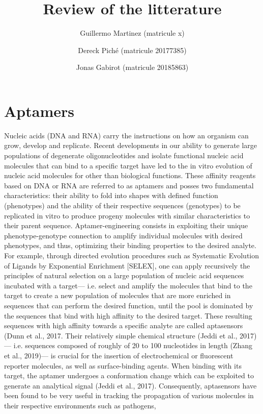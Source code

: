 \documentclass{article}
\title{Review of the litterature}
\author
{
    Guillermo Martinez (matricule x)
    \and
    Dereck Piché (matricule 20177385)
    \and
    Jonas Gabirot (matricule 20185863)
}
\begin{document}
\maketitle

\section*{Aptamers}
Nucleic acids (DNA and RNA) carry the instructions on 
how an organism can grow, develop and replicate. Recent
 developments in our ability to generate large populations of 
 degenerate oligonucleotides and isolate functional nucleic acid 
 molecules that can bind to a specific target have led to the in 
 vitro evolution of nucleic acid molecules for other than biological functions. 
 These affinity reagents based on DNA or RNA are referred to as aptamers 
 and posses two fundamental characteristics: their ability to fold 
 into shapes with defined function (phenotypes) and the ability of 
 their respective sequences (genotypes) to be replicated in vitro to 
 produce progeny molecules with similar characteristics to their 
 parent sequence. Aptamer-engineering consists in exploiting their 
 unique phenotype-genotype connection to amplify individual molecules 
 with desired phenotypes, and thus, optimizing their binding properties 
 to the desired analyte.  For example, through directed evolution 
 procedures such as Systematic Evolution of Ligands by Exponential 
 Enrichment [SELEX], one can apply recursively the principles of 
 natural selection on a large population of nucleic acid sequences 
 incubated with a target— i.e. select and amplify the molecules 
 that bind to the target to create a new population of molecules 
 that are more enriched in sequences that can perform the desired 
 function, until the pool is dominated by the sequences that bind 
 with high affinity to the desired target. These resulting sequences 
 with high affinity towards a specific analyte are called aptasensors 
 (Dunn et al., 2017. Their relatively simple chemical structure 
 (Jeddi et al., 2017)— i.e. sequences composed of roughly of 20 to 
 100 nucleotides in length (Zhang et al., 2019)— is crucial for the 
 insertion of electrochemical or fluorescent reporter molecules, as 
 well as surface-binding agents. When binding with its target, the 
 aptamer undergoes a conformation change which can be exploited to 
 generate an analytical signal (Jeddi et al., 2017). Consequently, 
 aptasensors have been found to be very useful in tracking the propagation 
 of various molecules in their respective environments such as pathogens, 
\end{document}
